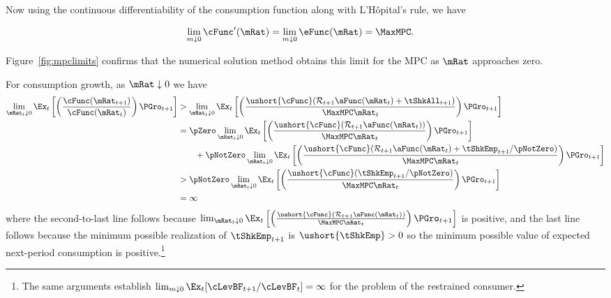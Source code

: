 \documentclass[./BufferStockTheory.tex]{subfiles}
\begin{document}
Now using the continuous differentiability of the consumption function
along with L'H\^opital's rule, we have
\begin{comment}
\begin{align*}
    \eFunc^{\prime}(\mRat)  & = \mRat^{-1} \cFunc^{\prime}(\mRat) - \mRat^{-2} \cFunc(\mRat)
\\ \mRat \eFunc^{\prime}(\mRat)  & = \cFunc^{\prime}(\mRat) - \cFunc(\mRat)/\mRat
\\ \cFunc^{\prime}(\mRat)  & = \eFunc(\mRat)+ \mRat \eFunc^{\prime}(\mRat)
\end{align*}
and since $0<\eFunc(\mRat)<1$ we have
\end{comment}
\begin{equation}\begin{gathered}\begin{aligned}
  \lim_{m \downarrow 0} \cFunc^{\prime}(\mRat)  & = \lim_{m \downarrow 0}
  \eFunc(\mRat) = \MaxMPC. \nonumber
\end{aligned}\end{gathered}\end{equation}

Figure~\ref{fig:mpclimits} confirms that the numerical solution method
obtains this limit for the MPC as $\mRat$ approaches zero.

For consumption growth, as $\mRat \downarrow 0$ we have
\begin{align*}
\lim_{\mRat_{t} \downarrow 0} \Ex_{t}\left[\left(\frac{\cFunc({\mRat}_{t+1})}{\cFunc(\mRat_t)}\right){\PGro}_{t+1}\right]
 & > \lim_{\mRat_{t} \downarrow 0} \Ex_{t}\left[\left(\frac{\ushort{\cFunc}({\mathcal{\mathcal{R}}}_{t+1}\aFunc(\mRat_{t})+{%
\tShkAll}_{t+1})}{\MaxMPC \mRat_{t}}\right){\PGro}_{t+1}\right]  \notag \\
  & = \pZero \lim_{\mRat_{t} \downarrow 0} \Ex_{t}\left[\left(\frac{\ushort{\cFunc}({\mathcal{\mathcal{R}}}_{t+1}\aFunc(\mRat_{t}))}{\MaxMPC \mRat_{t}}\right){\PGro}_{t+1}\right] \\
  & ~~~~~~ + \pNotZero \lim_{\mRat_{t} \downarrow 0}  \Ex_{t}\left[\left(\frac{\ushort{\cFunc}({\mathcal{\mathcal{R}}}_{t+1}\aFunc(\mRat_{t})+
\tShkEmp_{t+1}/\pNotZero)}{\MaxMPC \mRat_{t}}\right){\PGro}_{t+1}\right]  \\\notag
 & > \pNotZero \lim_{\mRat_{t} \downarrow 0} \Ex_{t}\left[\left(\frac{\ushort{\cFunc}(
\tShkEmp_{t+1}/\pNotZero)}{\MaxMPC \mRat_{t}}\right){\PGro}_{t+1}\right] \\
 & = \infty \nonumber
\end{align*}
where the second-to-last line follows because  $\lim_{\mRat_{t} \downarrow 0} \Ex_{t}\left[\left(\frac{\ushort{\cFunc}({\mathcal{\mathcal{R}}}_{t+1}\aFunc(\mRat_{t}))}{\MaxMPC \mRat_{t}}\right){\PGro}_{t+1}\right]$ is positive, and the last line follows because the minimum possible realization of $\tShkEmp_{t+1}$ is $\ushort{\tShkEmp}>0$ so the minimum possible value of expected next-period consumption is positive.\footnote{
The same arguments establish $\lim_{m \downarrow 0} \Ex_{t}[\cLevBF_{t+1}/\cLevBF_{t}] = \infty$
for the problem of the restrained consumer.%
}
\end{document}

